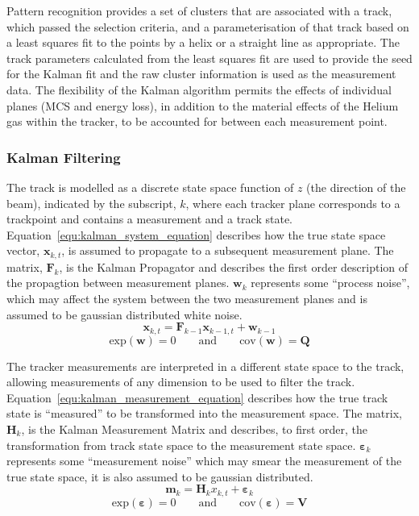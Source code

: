    Pattern recognition provides a set of clusters that are associated with a track, which passed the selection criteria, and a parameterisation of that track based on a least squares fit to the points by a helix or a straight line as appropriate. The track parameters calculated from the least squares fit are used to provide the seed for the Kalman fit and the raw cluster information is used as the measurement data. The flexibility of the Kalman algorithm permits the effects of individual planes (MCS and energy loss), in addition to the material effects of the Helium gas within the tracker, to be accounted for between each measurement point.

     \subsubsection{Kalman Filtering}

     The track is modelled as a discrete state space function of $z$ (the direction of the beam), indicated by the subscript, $k$, where each tracker plane corresponds to a trackpoint and contains a measurement and a track state. Equation~\ref{equ:kalman_system_equation} describes how the true state space vector, $\mathbf{x}_{k,t}$, is assumed to propagate to a subsequent measurement plane. The matrix, $\mathbf{F}_k$, is the Kalman Propagator and describes the first order description of the propagtion between measurement planes. $\mathbf{w}_k$ represents some ``process noise'', which may affect the system between the two measurement planes and is assumed to be gaussian distributed white noise.
    \begin{equation}
      \mathbf{x}_{k,t} = \mathbf{F}_{k-1}\mathbf{x}_{k-1,t} + \mathbf{w}_{k-1}
      \label{equ:kalman_system_equation}
    \end{equation}
    \begin{equation*}
      \textrm{exp}(\mathbf{w}) = 0 \quad\quad \textrm{and} \quad\quad \textrm{cov}(\mathbf{w}) = \mathbf{Q}
    \end{equation*}
     
     The tracker measurements are interpreted in a different state space to the track, allowing measurements of any dimension to be used to filter the track. Equation~\ref{equ:kalman_measurement_equation} describes how the true track state is ``measured'' to be transformed into the measurement space. The matrix, $\mathbf{H}_k$, is the Kalman Measurement Matrix and describes, to first order, the transformation from track state space to the measurement state space. $\mathbf{\varepsilon}_k$ represents some ``measurement noise'' which may smear the measurement of the true state space, it is also assumed to be gaussian distributed.
    \begin{equation}
      \mathbf{m}_k = \mathbf{H}_kx_{k,t} + \mathbf{\varepsilon}_k
      \label{equ:kalman_measurement_equation}
    \end{equation}
    \begin{equation*}
      \textrm{exp}(\mathbf{\varepsilon}) = 0 \quad\quad \textrm{and} \quad\quad \textrm{cov}(\mathbf{\varepsilon}) = \mathbf{V}
    \end{equation*}


